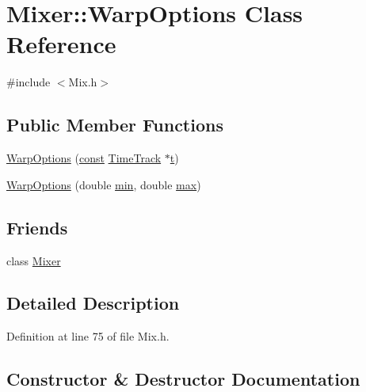 \hypertarget{class_mixer_1_1_warp_options}{}\section{Mixer\+:\+:Warp\+Options Class Reference}
\label{class_mixer_1_1_warp_options}


{\ttfamily \#include $<$Mix.\+h$>$}

\subsection*{Public Member Functions}
\begin{DoxyCompactItemize}
\item 
\hyperlink{class_mixer_1_1_warp_options_a8cb14a78d9936b93fd1e9c6ad8560c95}{Warp\+Options} (\hyperlink{getopt1_8c_a2c212835823e3c54a8ab6d95c652660e}{const} \hyperlink{class_time_track}{Time\+Track} $\ast$\hyperlink{octave__test_8m_aaccc9105df5383111407fd5b41255e23}{t})
\item 
\hyperlink{class_mixer_1_1_warp_options_ace2f2d6b56d45f299daa2a5916a079ac}{Warp\+Options} (double \hyperlink{_compare_audio_command_8cpp_abd8bbcfabb3ddef2ccaafb9928a37b95}{min}, double \hyperlink{_t_d_stretch_8cpp_ac39d9cef6a5e030ba8d9e11121054268}{max})
\end{DoxyCompactItemize}
\subsection*{Friends}
\begin{DoxyCompactItemize}
\item 
class \hyperlink{class_mixer_1_1_warp_options_a8068de75a009347cf0426abfcd321e6c}{Mixer}
\end{DoxyCompactItemize}


\subsection{Detailed Description}


Definition at line 75 of file Mix.\+h.



\subsection{Constructor \& Destructor Documentation}
